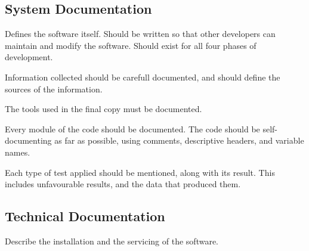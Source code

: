 \documentclass[\main/notes.tex]{subfiles}
\begin{document}
			\subsection{System Documentation}
				Defines the software itself. Should be written so that other developers can maintain and modify the software. Should exist for all four phases of development.
				\begin{indentparagraph}
					\begin{description}[nosep]
						\item[Analysis Phase] Information collected should be carefull documented, and should define the sources of the information.
						\item[Design Phase] The tools used in the final copy must be documented.
						\item[Implementation Phase] Every module of the code should be documented. The code should be self-documenting as far as possible, using comments, descriptive headers, and variable names.
						\item[Testing Phase] Each type of test applied should be mentioned, along with its result. This includes unfavourable results, and the data that produced them.
					\end{description}
				\end{indentparagraph}
			\subsection{Technical Documentation}
				Describe the installation and the servicing of the software.

\end{document}

